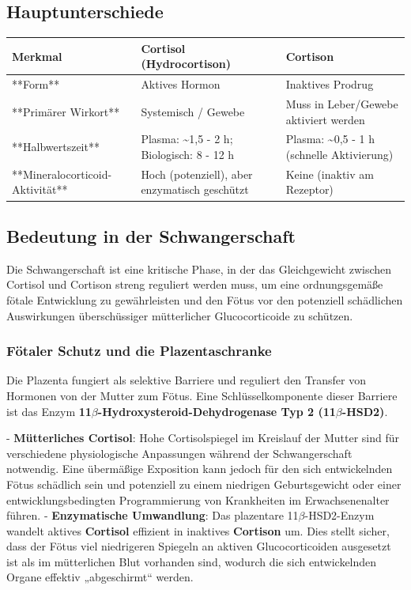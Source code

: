 \documentclass{article}
\begin{document}
\subsection{Hauptunterschiede}
\begin{center}
\begin{tabularx}{\textwidth}{|X|X|X|}
\hline
Merkmal & Cortisol (Hydrocortison) & Cortison \\
\hline
**Form** & Aktives Hormon & Inaktives Prodrug \\
\hline
**Primärer Wirkort** & Systemisch / Gewebe & Muss in Leber/Gewebe aktiviert werden \\
\hline
**Halbwertszeit** & Plasma: \textasciitilde{}1,5 - 2 h; Biologisch: 8 - 12 h & Plasma: \textasciitilde{}0,5 - 1 h (schnelle Aktivierung) \\
\hline
**Mineralocorticoid-Aktivität** & Hoch (potenziell), aber enzymatisch geschützt & Keine (inaktiv am Rezeptor) \\
\hline
\end{tabularx}
\end{center}


\subsection{Bedeutung in der Schwangerschaft}

Die Schwangerschaft ist eine kritische Phase, in der das Gleichgewicht zwischen Cortisol und Cortison streng reguliert werden muss, um eine ordnungsgemäße fötale Entwicklung zu gewährleisten und den Fötus vor den potenziell schädlichen Auswirkungen überschüssiger mütterlicher Glucocorticoide zu schützen.

\subsubsection{Fötaler Schutz und die Plazentaschranke}

Die Plazenta fungiert als selektive Barriere und reguliert den Transfer von Hormonen von der Mutter zum Fötus. Eine Schlüsselkomponente dieser Barriere ist das Enzym \textbf{11\texorpdfstring{$\beta$}{beta}-Hydroxysteroid-Dehydrogenase Typ 2 (11\texorpdfstring{$\beta$}{beta}-HSD2)}.

- \textbf{Mütterliches Cortisol}: Hohe Cortisolspiegel im Kreislauf der Mutter sind für verschiedene physiologische Anpassungen während der Schwangerschaft notwendig. Eine übermäßige Exposition kann jedoch für den sich entwickelnden Fötus schädlich sein und potenziell zu einem niedrigen Geburtsgewicht oder einer entwicklungsbedingten Programmierung von Krankheiten im Erwachsenenalter führen.
- \textbf{Enzymatische Umwandlung}: Das plazentare 11\texorpdfstring{$\beta$}{beta}-HSD2-Enzym wandelt aktives \textbf{Cortisol} effizient in inaktives \textbf{Cortison} um. Dies stellt sicher, dass der Fötus viel niedrigeren Spiegeln an aktiven Glucocorticoiden ausgesetzt ist als im mütterlichen Blut vorhanden sind, wodurch die sich entwickelnden Organe effektiv „abgeschirmt“ werden.
\end{document}
